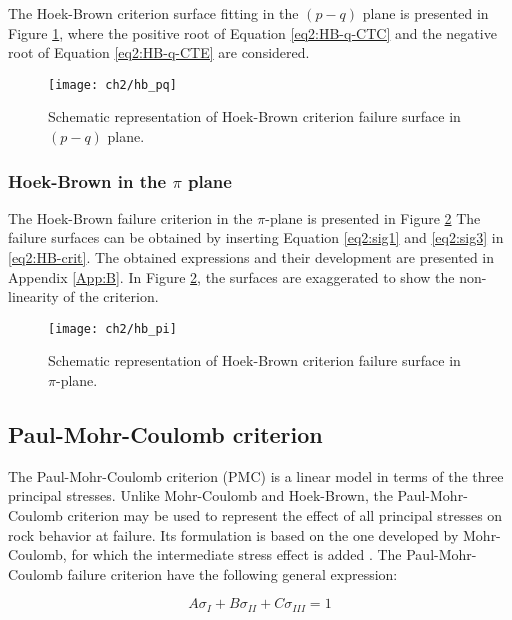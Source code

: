 The Hoek-Brown criterion surface fitting in the $(p-q)$ plane is presented in Figure \ref{fig2:hb_pq}, where the positive root of Equation \ref{eq2:HB-q-CTC} and the negative root of Equation \ref{eq2:HB-q-CTE} are considered.

\begin{figure}[tb]
    \centering
    \texttt{[image: ch2/hb\_pq]}
    \caption{Schematic representation of Hoek-Brown criterion failure surface in $(p-q)$ plane.}
    \label{fig2:hb_pq}
\end{figure} 

\subsubsection{Hoek-Brown in the \texorpdfstring{$\pi$}{pi} plane}\label{ch2:HB_pi}

The Hoek-Brown failure criterion in the $\pi$-plane is presented in Figure \ref{fig2:hb_pi} The failure surfaces can be obtained by inserting Equation \ref{eq2:sig1} and \ref{eq2:sig3} in \ref{eq2:HB-crit}. The obtained expressions and their development are presented in Appendix \ref{App:B}. In Figure \ref{fig2:hb_pi}, the surfaces are exaggerated to show the non-linearity of the criterion.  

\begin{figure}[tb]
    \centering
    \texttt{[image: ch2/hb\_pi]}
    \caption{Schematic representation of Hoek-Brown criterion failure surface in $\pi$-plane.}
    \label{fig2:hb_pi}
\end{figure} 

\subsection{Paul-Mohr-Coulomb criterion}\label{ch2:PMC}

The Paul-Mohr-Coulomb criterion (PMC) is a linear model in terms of the three principal stresses. Unlike Mohr-Coulomb and Hoek-Brown, the Paul-Mohr-Coulomb criterion may be used to represent the effect of all principal stresses on rock behavior at failure. Its formulation is based on the one developed by Mohr-Coulomb, for which the intermediate stress effect is added \cite{Paul1968}. The Paul-Mohr-Coulomb failure criterion have the following general expression:

\begin{equation}\label{eq2:PMC}
    A\sigma_I + B\sigma_{II}+C\sigma_{III} = 1
\end{equation}

